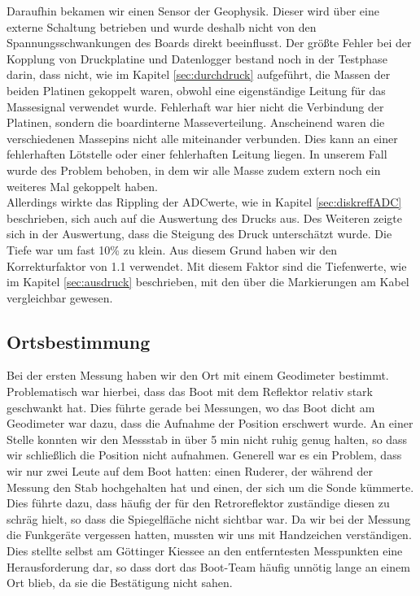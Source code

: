 \documentclass[12pt,a4paper,titlepage,headinclude,bibtotoc]{scrartcl}
\numberwithin{equation}{subsection}
\begin{document}
Daraufhin bekamen wir einen Sensor der Geophysik.
Dieser wird über eine externe Schaltung betrieben und wurde deshalb nicht von den Spannungsschwankungen des Boards direkt beeinflusst.
Der größte Fehler bei der Kopplung von Druckplatine und Datenlogger bestand noch in der Testphase darin, dass nicht, wie im Kapitel \ref{sec:durchdruck} aufgeführt, die Massen der beiden Platinen gekoppelt waren, obwohl eine eigenständige Leitung für das Massesignal verwendet wurde.
Fehlerhaft war hier nicht die Verbindung der Platinen, sondern die boardinterne Masseverteilung.
Anscheinend waren die verschiedenen Massepins nicht alle miteinander verbunden.
Dies kann an einer fehlerhaften Lötstelle oder einer fehlerhaften Leitung liegen.
In unserem Fall wurde des Problem behoben, in dem wir alle Masse zudem extern noch ein weiteres Mal gekoppelt haben.\\
Allerdings wirkte das Rippling der ADCwerte, wie in Kapitel \ref{sec:diskreffADC} beschrieben, sich auch auf die Auswertung des Drucks aus.
Des Weiteren zeigte sich in der Auswertung, dass die Steigung des Druck unterschätzt wurde.
Die Tiefe war um fast 10\% zu klein.
Aus diesem Grund haben wir den Korrekturfaktor von 1.1 verwendet.
Mit diesem Faktor sind die Tiefenwerte, wie im Kapitel \ref{sec:ausdruck} beschrieben, mit den über die Markierungen am Kabel vergleichbar gewesen.

\subsection{Ortsbestimmung}
Bei der ersten Messung haben wir den Ort mit einem Geodimeter bestimmt.
Problematisch war hierbei, dass das Boot mit dem Reflektor relativ stark geschwankt hat.
Dies führte gerade bei Messungen, wo das Boot dicht am Geodimeter war dazu, dass die Aufnahme der Position erschwert wurde.
An einer Stelle konnten wir den Messstab in über 5 min nicht ruhig genug halten, so dass wir schließlich die Position nicht aufnahmen.
Generell war es ein Problem, dass wir nur zwei Leute auf dem Boot hatten: einen Ruderer, der während der Messung den Stab hochgehalten hat und einen, der sich um die Sonde kümmerte.
Dies führte dazu, dass häufig der für den Retroreflektor zuständige diesen zu schräg hielt, so dass die Spiegelfläche nicht sichtbar war.
Da wir bei der Messung die Funkgeräte vergessen hatten, mussten wir uns mit Handzeichen verständigen.
Dies stellte selbst am Göttinger Kiessee an den entferntesten Messpunkten eine Herausforderung dar, so dass dort das Boot-Team häufig unnötig lange an einem Ort blieb, da sie die Bestätigung nicht sahen.
\end{document}
